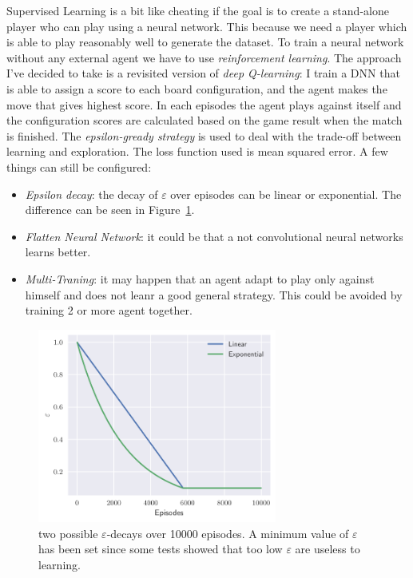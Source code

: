 \documentclass{article}
\begin{document}
  
  Supervised Learning is a bit like cheating if the goal is to create a stand-alone player who can play using a neural network. This because we need a player which is able to play reasonably well to generate the dataset. To train a neural network without any external agent we have to use \emph{reinforcement learning}. The approach I've decided to take is a revisited version of \emph{deep Q-learning}: I train a DNN that is able to assign a score to each board configuration, and the agent makes the move that gives highest score. In each episodes the agent plays against itself and the configuration scores are calculated based on the game result when the match is finished. The \emph{epsilon-gready strategy} is used to deal with the trade-off between learning and exploration. The loss function used is mean squared error. A few things can still be configured:
  \begin{itemize}
    \item \emph{Epsilon decay}: the decay of \(\varepsilon\) over episodes can be linear or exponential. The difference can be seen in Figure~\ref{fig:decays}. 
    \item \emph{Flatten Neural Network}: it could be that a not convolutional neural networks learns better.
    \item \emph{Multi-Traning}: it may happen that an agent adapt to play only against himself and does not leanr a good general strategy. This could be avoided by training 2 or more agent together.
  \end{itemize}
  \begin{figure}
    \centering
    \includegraphics[width=0.7\textwidth]{img/decay.pdf}
    
    \caption{two possible \(\varepsilon\)-decays over 10000 episodes. A minimum value of \(\varepsilon\) has been set since some tests showed that too low \(\varepsilon\) are useless to learning.}
    \label{fig:decays}
  \end{figure}
\end{document}
